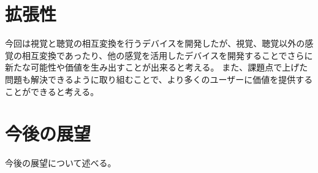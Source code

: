 \section{拡張性}
今回は視覚と聴覚の相互変換を行うデバイスを開発したが、視覚、聴覚以外の感覚の相互変換であったり、他の感覚を活用したデバイスを開発することでさらに新たな可能性や価値を生み出すことが出来ると考える。
また、課題点で上げた問題も解決できるように取り組むことで、より多くのユーザーに価値を提供することができると考える。

\section{今後の展望}
今後の展望について述べる。

\newpage\clearpage
\vspace*{-20pt}
\printbibliography[segment=\therefsegment,heading=subbibliography]
